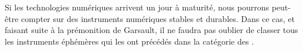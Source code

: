 \indent Si les technologies numériques arrivent un jour à maturité, nous pourrons peut-être compter sur des instruments numériques stables et durables. Dans ce cas, et faisant suite à la prémonition de Garsault, il ne faudra pas oublier de classer tous les instruments éphémères qui les ont précédés dans la catégorie des .





